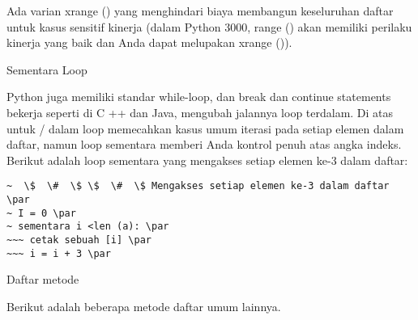 \vspace{12pt}
Ada varian xrange () yang menghindari biaya membangun keseluruhan daftar untuk kasus sensitif kinerja (dalam Python 3000, range () akan memiliki perilaku kinerja yang baik dan Anda dapat melupakan xrange ()). \par
Sementara Loop \par
\vspace{12pt}
Python juga memiliki standar while-loop, dan \* break \* dan \* continue \* statements bekerja seperti di C ++ dan Java, mengubah jalannya loop terdalam. Di atas untuk / dalam loop memecahkan kasus umum iterasi pada setiap elemen dalam daftar, namun loop sementara memberi Anda kontrol penuh atas angka indeks. Berikut adalah loop sementara yang mengakses setiap elemen ke-3 dalam daftar: \par
\vspace{12pt}
\begin{verbatim}
~  \$  \#  \$ \$  \#  \$ Mengakses setiap elemen ke-3 dalam daftar \par
~ I = 0 \par
~ sementara i <len (a): \par
~~~ cetak sebuah [i] \par
~~~ i = i + 3 \par
\end{verbatim}
Daftar metode \par
\vspace{12pt}
Berikut adalah beberapa metode daftar umum lainnya. \par
\vspace{12pt}
